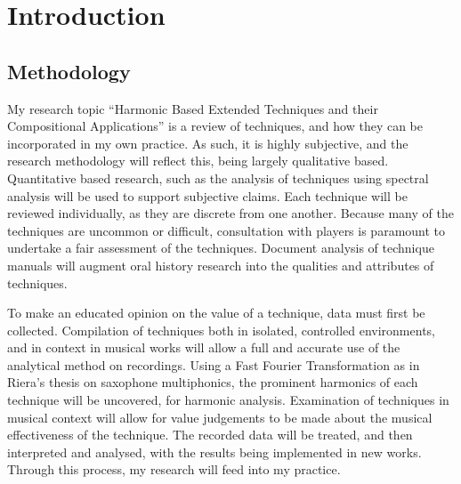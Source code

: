 
\doublespace{}
\chapter[Introduction]{Introduction}

\section{Methodology}
My research topic “Harmonic Based Extended Techniques and their Compositional Applications” is a review of techniques, and how they can be incorporated in my own practice. As such, it is highly subjective, and the research methodology will reflect this, being largely qualitative based. Quantitative based research, such as the analysis of techniques using spectral analysis will be used to support subjective claims. Each technique will be reviewed individually, as they are discrete from one another. Because many of the techniques are uncommon or difficult, consultation with players is paramount to undertake a fair assessment of the techniques. Document analysis of technique manuals will augment oral history research into the qualities and attributes of techniques.

To make an educated opinion on the value of a technique, data must first be collected. Compilation of techniques both in isolated, controlled environments, and in context in musical works will allow a full and accurate use of the analytical method on recordings. Using a Fast Fourier Transformation as in Riera’s thesis on saxophone multiphonics, the prominent harmonics of each technique will be uncovered, for harmonic analysis.\autocite{rieraComparativeStudySaxophone2014} Examination of techniques in musical context will allow for value judgements to be made about the musical effectiveness of the technique. The recorded data will be treated, and then interpreted and analysed, with the results being implemented in new works.\autocite{torresMultiphonicsCompositionalElement2012} Through this process, my research will feed into my practice.

